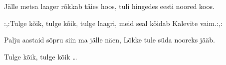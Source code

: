 J\"alle metsa laager r\~okkab t\"aies hoos,
tuli hingedes eesti noored koos.

:,:Tulge k\~oik, tulge k\~oik, tulge laagri,
meid seal k\"oidab Kalevite vaim.:,:

Palju aastaid s\~opru siin ma j\"alle n\"aen,
L\~okke tule s\"uda nooreks j\"a\"ab.

Tulge k\~oik, tulge k\~oik \ldots